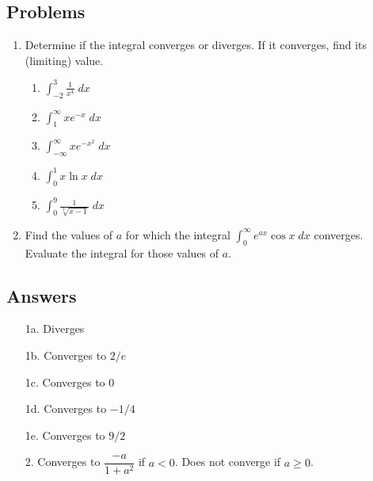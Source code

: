 \documentclass[12pt,letterpaper,fleqn]{article}
\newcommand{\ds}{\displaystyle}
\theoremstyle{definition}
\begin{document}
\subsection*{Problems}
\begin{enumerate}
\item Determine if the integral converges or diverges. If it converges, find its (limiting) value.
\begin{enumerate}
  \item $\ds\int_{-2}^3 \frac{1}{x^4}\;dx$
  \item $\ds\int_1^\infty xe^{-x}\;dx$
  \item $\ds\int_{-\infty}^{\infty}xe^{-x^2}\;dx$
  \item $\ds\int_0^1 x\ln x\;dx$
  \item $\ds\int_0^9 \frac{1}{\sqrt[3]{x-1}}\;dx$
\end{enumerate}
\item Find the values of $a$ for which the integral $\ds\int_0^\infty e^{ax}\cos x\;dx$ converges. Evaluate the integral for those values of $a$.
\end{enumerate}
\newpage
\subsection*{Answers}
\begin{enumerate}
  \item[1a.] Diverges
  \item[1b.] Converges to $2/e$
  \item[1c.] Converges to $0$
  \item[1d.] Converges to $-1/4$
  \item[1e.] Converges to $9/2$
  \item[2.\hspace{0.5em}] Converges to $\dfrac{-a}{1+a^2}$ if $a < 0$. Does not converge if $a\geq 0$.
\end{enumerate}
\end{document}
